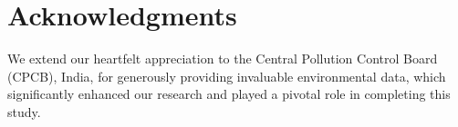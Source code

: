 \documentclass[a4paper, fleqn]{cas-sc}
\theoremstyle{definition}
\theoremstyle{remark}
\begin{document}
\section*{Acknowledgments}
We extend our heartfelt appreciation to the Central Pollution Control Board (CPCB),  India,  for generously providing invaluable environmental data,  which significantly enhanced our research and played a pivotal role in completing this study.
\label{}

\end{document}
